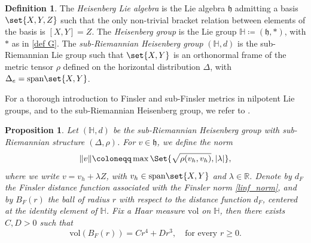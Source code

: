 \documentclass[a4paper,11pt,reqno]{amsart}
\theoremstyle{plain}
\newtheorem{proposition}[theorem]{Proposition}
\theoremstyle{definition}
\newtheorem{definition}[theorem]{Definition}
\newtheorem{remark}[theorem]{Remark}
\newcommand{\R}{\mathbb R}
\renewcommand{\H}{\mathbb H}
\newcommand{\spn}{\mathrm{span}}
\newcommand{\vol}{\mathrm{vol}}
\newcommand{\id}{e}
\newcommand{\coloneq}{\coloneqq}
\begin{document}
 \begin{definition}
 The \emph{Heisenberg Lie algebra} is the Lie algebra $\mathfrak{h}$ admitting a basis $\set{X,Y,Z}$ such that the only non-trivial bracket relation between elements of the basis is $[X,Y]=Z$. The \emph{Heisenberg group} is the Lie group $\H \coloneq (\mathfrak{h},*)$, with $*$ as in \eqref{def G}. 
 The \emph{sub-Riemannian Heisenberg group} $(\H,d)$ is the sub-Riemannian Lie group such that $\set{X,Y}$ is an orthonormal frame of the metric tensor $\rho$ defined on the horizontal distribution $\Delta$, with $\Delta_\id = \spn\set{X,Y}$.
 \end{definition}

 For a thorough introduction to Finsler and sub-Finsler metrics in nilpotent Lie groups, and to the sub-Riemannian Heisenberg group, we refer to \cite{donne2024metricliegroupscarnotcaratheodory}.
 

\begin{proposition} \label{prop_linf}
 Let $(\H,d)$ be the sub-Riemannian Heisenberg group with sub-Riemannian structure $(\Delta,\rho)$. For $v \in \mathfrak{h}$, we define the norm
 \begin{equation} \label{linf_norm}
 \lVert v \rVert \coloneq \max \Set{ \sqrt{\rho(v_h,v_h)}, \lvert \lambda \rvert}, 
 \end{equation}
 where we write $v = v_h + \lambda Z$, with $v_h \in \spn \set{X,Y}$ and $\lambda\in \R$. Denote by $d_F$ the Finsler distance function associated with the Finsler norm \eqref{linf_norm}, and by $B_F(r)$ the ball of radius $r$ with respect to the distance function $d_F$, centered at the identity element of $\H$. Fix a Haar measure $\vol$ on $\H$, then there exists $C,D > 0$ such that
 \begin{equation} \label{polinomial inf}
 \vol \left(B_F(r)\right) = Cr^4 + Dr^3, \quad \text{for every $r \ge 0$.}
 \end{equation}
\end{proposition}
\end{document}
